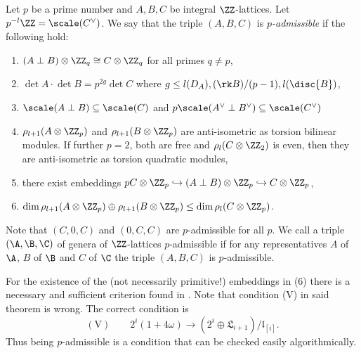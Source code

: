 \begin{definition}
 Let $p$ be a prime number and $A,B,C$ be integral $\ZZ$-lattices. Let $p^{-l}\ZZ =\scale(C^\vee)$.
 We say that the triple $(A,B,C)$ is
 \emph{$p$-admissible} if the following hold:
 \begin{enumerate}\setlength{\itemsep3pt}
  \item $(A  \perp B) \otimes \ZZ_q \cong C \otimes \ZZ_q$ for all primes $q\neq p$,
  \item $\det A\cdot \det B=p^{2g}\det C$ where $g \leq l(D_A),(\rk B)/(p-1),l(\disc{B})$,
  \item $\scale(A \perp B)\subseteq \scale(C)$ and $p \scale(A^\vee \perp B^\vee) \subseteq \scale(C^\vee)$
  \item $\rho_{l+1}(A\otimes \ZZ_p)$ and $\rho_{l+1}(B\otimes \ZZ_p)$ are anti-isometric as torsion bilinear modules. If further $p=2$, both are free and $\rho_l(C\otimes \ZZ_2)$ is even, then they are anti-isometric as torsion quadratic modules,
  \item there exist embeddings $pC\otimes \ZZ_p \hookrightarrow (A \perp B) \otimes \ZZ_p \hookrightarrow C\otimes \ZZ_p$,
  \item $\dim \rho_{l+1}(A\otimes \ZZ_p)\oplus \rho_{l+1}(B \otimes \ZZ_p) \leq \dim \rho_l(C \otimes \ZZ_p)$.
 \end{enumerate}
\end{definition}

Note that $(C,0,C)$ and $(0,C,C)$ are $p$-admissible for all $p$.
We call a triple $(\A,\B,\C)$ of genera of $\ZZ$-lattices $p$-admissible if for any representatives $A$ of $\A$, $B$ of $\B$ and $C$ of $\C$ the triple $(A,B,C)$ is $p$-admissible.

\begin{remark}
 For the existence of the (not necessarily primitive!) embeddings in (6) there is a necessary and sufficient criterion found in \cite[Theorem 3]{omeara1958}. Note that condition (V) in said theorem is wrong.
 The correct condition is
 \[(\mathrm{V}) \qquad 2^i (1+4 \omega) \to (2^i \oplus \mathfrak{L}_{i+1})/ \mathfrak{l}_{[i]}.\]
 Thus being $p$-admissible is a condition that can be checked easily algorithmically.
\end{remark}

